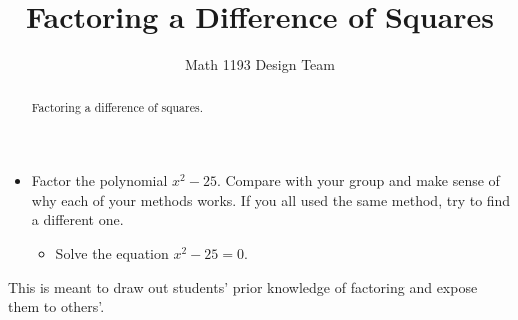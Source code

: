 \documentclass[noauthor]{ximera}
\title{Factoring a Difference of Squares}
\author{Math 1193 Design Team}
\begin{document}
\begin{abstract}
    Factoring a difference of squares.
\end{abstract}
\maketitle

\begin{itemize}
    \item Factor the polynomial \(x^2 - 25\). Compare with 
your group and make sense of why each of your methods
works. If you all used the same method, try to find
a different one.
    \begin{itemize}
        \item Solve the equation \(x^2 - 25 = 0\).
    \end{itemize}
\end{itemize}

\begin{instructorNotes}
This is meant to draw out students' prior knowledge of factoring and expose them to others'.
\end{instructorNotes}
\end{document}
